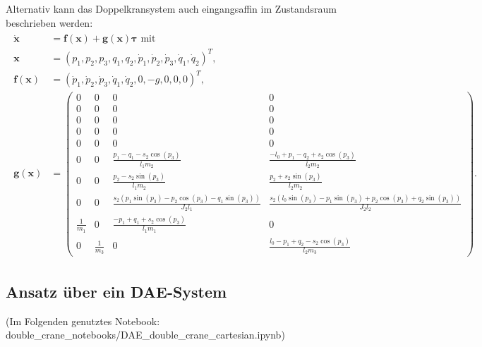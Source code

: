 Alternativ kann das Doppelkransystem auch eingangsaffin im Zustandsraum beschrieben werden:
\begin{align}
	\label{eq:state_space_double_crane}
	\begin{split}
		\dot{\mathbf{x}} &= \mathbf{f}(\mathbf{x}) + \mathbf{g}(\mathbf{x}) \boldsymbol{\tau} \text{ mit } \\ 
		\mathbf{x} &= (p_{1},	p_{2}, p_{3}, q_{1}, q_{2}, \dot{p}_{1}, \dot{p}_{2}, \dot{p}_{3}, \dot{q}_{1}, \dot{q}_{2})^T, \\
		\mathbf{f}(\mathbf{x}) &= 
		(\dot{p}_{1}, \dot{p}_{2}, \dot{p}_{3}, \dot{q}_{1}, \dot{q}_{2}, 0, -g, 0, 0, 0)^T, \\ 
		\mathbf{g}(\mathbf{x}) &=
		\left(\begin{smallmatrix}
			0 & 0 & 0 & 0\\
			0 & 0 & 0 & 0\\
			0 & 0 & 0 & 0\\
			0 & 0 & 0 & 0\\
			0 & 0 & 0 & 0\\
			0 & 0 & \frac{p_{1} - q_{1} - s_{2} \cos{\left(p_{3} \right)}}{l_{1} m_{2}} & \frac{- l_{0} + p_{1} - q_{2} + s_{2} \cos{\left(p_{3} \right)}}{l_{2} m_{2}}\\
			0 & 0 & \frac{p_{2} - s_{2} \sin{\left(p_{3} \right)}}{l_{1} m_{2}} & \frac{p_{2} + s_{2} \sin{\left(p_{3} \right)}}{l_{2} m_{2}}\\
			0 & 0 & \frac{s_{2} \left(p_{1} \sin{\left(p_{3} \right)} - p_{2} \cos{\left(p_{3} \right)} - q_{1} \sin{\left(p_{3} \right)}\right)}{J_{2} l_{1}} & \frac{s_{2} \left(l_{0} \sin{\left(p_{3} \right)} - p_{1} \sin{\left(p_{3} \right)} + p_{2} \cos{\left(p_{3} \right)} + q_{2} \sin{\left(p_{3} \right)}\right)}{J_{2} l_{2}}\\
			\frac{1}{m_{1}} & 0 & \frac{- p_{1} + q_{1} + s_{2} \cos{\left(p_{3} \right)}}{l_{1} m_{1}} & 0\\
			0 & \frac{1}{m_{3}} & 0 & \frac{l_{0} - p_{1} + q_{2} - s_{2} \cos{\left(p_{3} \right)}}{l_{2} m_{3}}
		\end{smallmatrix}\right).
	\end{split}
\end{align}

\subsection{Ansatz über ein DAE-System}
(Im Folgenden genutztes Notebook: double\_crane\_notebooks/DAE\_double\_crane\_cartesian.ipynb)

